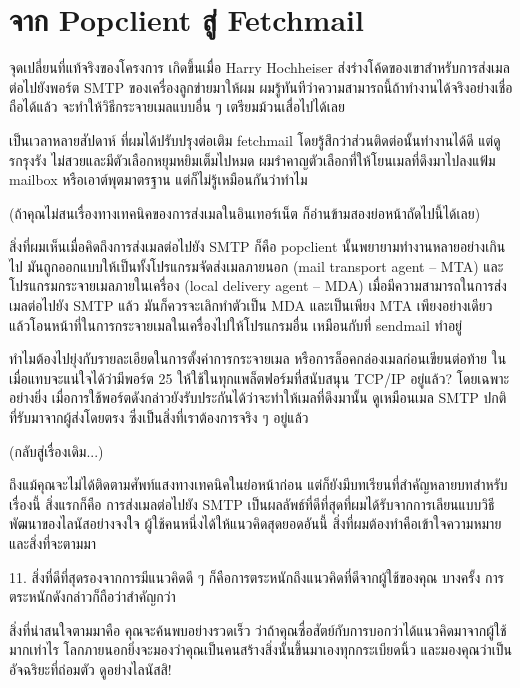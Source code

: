 \chapter{จาก Popclient สู่ Fetchmail}

จุดเปลี่ยนที่แท้จริงของโครงการ เกิดขึ้นเมื่อ Harry Hochheiser
ส่งร่างโค้ดของเขาสำหรับการส่งเมลต่อไปยังพอร์ต SMTP
ของเครื่องลูกข่ายมาให้ผม
ผมรู้ทันทีว่าความสามารถนี้ถ้าทำงานได้จริงอย่างเชื่อถือได้แล้ว
จะทำให้วิธีกระจายเมลแบบอื่น ๆ  เตรียมม้วนเสื่อไปได้เลย

เป็นเวลาหลายสัปดาห์ ที่ผมได้ปรับปรุงต่อเติม fetchmail
โดยรู้สึกว่าส่วนติดต่อนั้นทำงานได้ดี แต่ดูรกรุงรัง
ไม่สวยและมีตัวเลือกหยุมหยิมเต็มไปหมด
ผมรำคาญตัวเลือกที่ให้โยนเมลที่ดึงมาไปลงแฟ้ม mailbox หรือเอาต์พุตมาตรฐาน
แต่ก็ไม่รู้เหมือนกันว่าทำไม

\noindent (ถ้าคุณไม่สนเรื่องทางเทคนิคของการส่งเมลในอินเทอร์เน็ต
ก็อ่านข้ามสองย่อหน้าถัดไปนี้ได้เลย)

สิ่งที่ผมเห็นเมื่อคิดถึงการส่งเมลต่อไปยัง SMTP ก็คือ pop\-client %
นั้นพยายามทำงานหลายอย่างเกินไป มันถูกออกแบบให้เป็นทั้งโปรแกรมจัดส่งเมลภายนอก
(mail transport agent -- MTA) และโปรแกรมกระจายเมลภายในเครื่อง (local delivery agent -- MDA)
เมื่อมีความสามารถในการส่งเมลต่อไปยัง SMTP แล้ว มันก็ควรจะเลิกทำตัวเป็น
MDA และเป็นเพียง MTA เพียงอย่างเดียว
แล้วโอนหน้าที่ในการกระจายเมลในเครื่องไปให้โปรแกรมอื่น เหมือนกับที่
sendmail ทำอยู่

ทำไมต้องไปยุ่งกับรายละเอียดในการตั้งค่าการกระจายเมล
หรือการล็อคกล่องเมลก่อนเขียนต่อท้าย ในเมื่อแทบจะแน่ใจได้ว่ามีพอร์ต 25
ให้ใช้ในทุกแพล็ตฟอร์มที่สนับสนุน TCP/IP อยู่แล้ว? โดยเฉพาะอย่างยิ่ง
เมื่อการใช้พอร์ตดังกล่าวยังรับประกันได้ว่าจะทำให้เมลที่ดึงมานั้น
ดูเหมือนเมล SMTP ปกติที่รับมาจากผู้ส่งโดยตรง
ซึ่งเป็นสิ่งที่เราต้องการจริง ๆ  อยู่แล้ว

\noindent (กลับสู่เรื่องเดิม...)

ถึงแม้คุณจะไม่ได้ติดตามศัพท์แสงทางเทคนิคในย่อหน้าก่อน
แต่ก็ยังมีบทเรียนที่สำคัญหลายบทสำหรับเรื่องนี้ สิ่งแรกก็คือ
การส่งเมลต่อไปยัง SMTP
เป็นผลลัพธ์ที่ดีที่สุดที่ผมได้รับจากการเลียนแบบวิธีพัฒนาของไลนัสอย่างจงใจ
ผู้ใช้คนหนึ่งได้ให้แนวคิดสุดยอดอันนี้
สิ่งที่ผมต้องทำคือเข้าใจความหมายและสิ่งที่จะตามมา

\begin{fancyquotes}
  11. สิ่งที่ดีที่สุดรองจากการมีแนวคิดดี ๆ
  ก็คือการตระหนักถึงแนวคิดที่ดีจากผู้ใช้ของคุณ บางครั้ง
  การตระหนักดังกล่าวก็ถือว่าสำคัญกว่า
\end{fancyquotes}

สิ่งที่น่าสนใจตามมาคือ คุณจะค้นพบอย่างรวดเร็ว
ว่าถ้าคุณซื่อสัตย์กับการบอกว่าได้แนวคิดมาจากผู้ใช้มากเท่าไร
โลกภายนอกยิ่งจะมองว่าคุณเป็นคนสร้างสิ่งนั้นขึ้นมาเองทุกกระเบียดนิ้ว
และมองคุณว่าเป็นอัจฉริยะที่ถ่อมตัว ดูอย่างไลนัสสิ!

